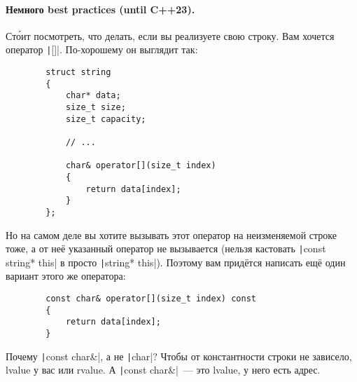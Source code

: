 \documentclass{article}
\begin{document}
    \paragraph{Немного best practices (until C++23).}
    Ст\'{о}ит посмотреть, что делать, если вы реализуете свою строку. Вам хочется оператор \texttt|[]|. По-хорошему он выглядит так:
    \begin{verbatim}
        struct string
        {
            char* data;
            size_t size;
            size_t capacity;

            // ...

            char& operator[](size_t index)
            {
                return data[index];
            }
        };
    \end{verbatim}
    Но на самом деле вы хотите вызывать этот оператор на неизменяемой строке тоже, а от неё указанный оператор не вызывается (нельзя кастовать \texttt|const string* this| в просто \texttt|string* this|). Поэтому вам придётся написать ещё один вариант этого же оператора:
    \begin{verbatim}
        const char& operator[](size_t index) const
        {
            return data[index];
        }
    \end{verbatim}
    Почему \texttt|const char&|, а не \texttt|char|? Чтобы от константности строки не зависело, lvalue у вас или rvalue. А \texttt|const char&|~--- это lvalue, у него есть адрес.
\end{document}
